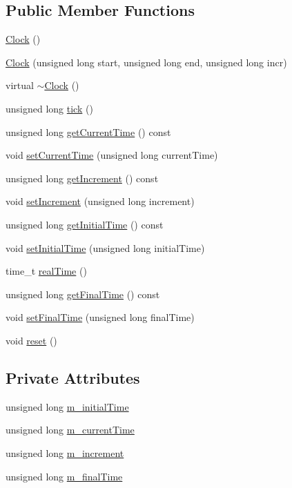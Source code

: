 \subsection*{Public Member Functions}
\begin{DoxyCompactItemize}
\item 
\mbox{\hyperlink{class_clock_adbc370eb6b5f8d01645cf440188160a8}{Clock}} ()
\item 
\mbox{\hyperlink{class_clock_a89a798e152f8eba2f6eb80ec92b26ece}{Clock}} (unsigned long start, unsigned long end, unsigned long incr)
\item 
virtual \mbox{\hyperlink{class_clock_ac1ddbca9092c61e98668473209f36b19}{$\sim$\+Clock}} ()
\item 
unsigned long \mbox{\hyperlink{class_clock_ab7c857c5b43cf98d991435ba9ce46b2c}{tick}} ()
\item 
unsigned long \mbox{\hyperlink{class_clock_a17b19c062d1f0344f37b57cc2dfdaa14}{get\+Current\+Time}} () const
\item 
void \mbox{\hyperlink{class_clock_a7046e8733ab749d3c24b3c61bd108d6c}{set\+Current\+Time}} (unsigned long current\+Time)
\item 
unsigned long \mbox{\hyperlink{class_clock_a804626d5455f4a2a73321f84ed7a9819}{get\+Increment}} () const
\item 
void \mbox{\hyperlink{class_clock_a1ae60dca4e41f6e27d6104ec618c02f1}{set\+Increment}} (unsigned long increment)
\item 
unsigned long \mbox{\hyperlink{class_clock_a9792f62fed3c320abecc5c455b13a804}{get\+Initial\+Time}} () const
\item 
void \mbox{\hyperlink{class_clock_abe7fb8f715d0dcae08e52b2b7aed7db2}{set\+Initial\+Time}} (unsigned long initial\+Time)
\item 
time\+\_\+t \mbox{\hyperlink{class_clock_a29512d39298cafed334d0c01da70ea7b}{real\+Time}} ()
\item 
unsigned long \mbox{\hyperlink{class_clock_a0b9ef0b9272d6555bb0fdca4978c705d}{get\+Final\+Time}} () const
\item 
void \mbox{\hyperlink{class_clock_a4780f83b55bc2539cd7069cfc4f06d99}{set\+Final\+Time}} (unsigned long final\+Time)
\item 
void \mbox{\hyperlink{class_clock_a0ab5423b0a997aa13d7b6131c46d1358}{reset}} ()
\end{DoxyCompactItemize}
\subsection*{Private Attributes}
\begin{DoxyCompactItemize}
\item 
unsigned long \mbox{\hyperlink{class_clock_a71afbea0f41f612e36d45ee2bb79ff0e}{m\+\_\+initial\+Time}}
\item 
unsigned long \mbox{\hyperlink{class_clock_a73bf4edfc8f0fe2548ef6956f68b678e}{m\+\_\+current\+Time}}
\item 
unsigned long \mbox{\hyperlink{class_clock_a2f940f0a30d58d1f7f36d0296463b9aa}{m\+\_\+increment}}
\item 
unsigned long \mbox{\hyperlink{class_clock_a5c473d84c1051d946ab5565060902840}{m\+\_\+final\+Time}}
\end{DoxyCompactItemize}


